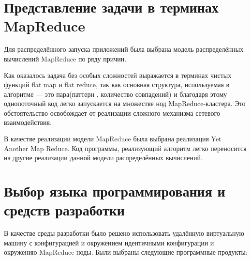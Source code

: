 \section{Представление задачи в терминах MapReduce}
Для распределённого запуска приложений была выбрана модель распределённых
вычислений MapReduce\footnotemark
{}
по ряду причин.

Как оказалось задача без особых сложностей выражается в терминах
чистых функций flat map и flat reduce, так как основная структура,
используемая в алгоритме --- это пара(паттерн\footnotemark
{},
количество совпадений) и благодаря этому однопоточный код легко запускается
на множестве нод MapReduce-кластера. Это обстоятельство освобождает
от реализации сложного механизма сетевого взаимодействия.

В качестве реализации модели MapReduce была выбрана реализация
Yet Another Map Reduce. Код программы, реализующий алгоритм легко переносится
на другие реализации данной модели распределённых вычислений.


\section{Выбор языка программирования и средств разработки}
В качестве среды разработки было решено использовать удалённую виртуальную
машину с конфигурацией и окружением идентичными конфигурации и окружению
MapReduce ноды. Были выбраны следующие программные продукты:

